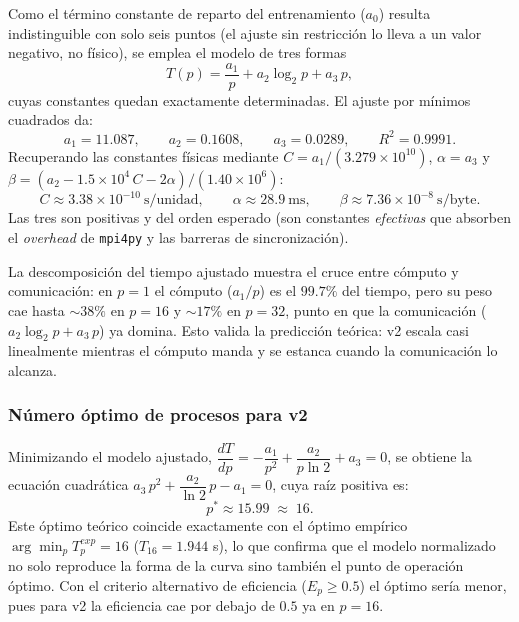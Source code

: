 Como el término constante de reparto del entrenamiento ($a_0$) resulta indistinguible con solo seis
puntos (el ajuste sin restricción lo lleva a un valor negativo, no físico), se emplea el modelo de
tres formas
\[
T(p) = \frac{a_1}{p} + a_2\log_2 p + a_3\,p,
\]
cuyas constantes quedan exactamente determinadas. El ajuste por mínimos cuadrados da:
\[
a_1 = 11.087,
\qquad
a_2 = 0.1608,
\qquad
a_3 = 0.0289,
\qquad
R^2 = 0.9991.
\]
Recuperando las constantes físicas mediante $C = a_1/(3.279\times10^{10})$, $\alpha = a_3$ y
$\beta = (a_2 - 1.5\times10^4\,C - 2\alpha)/(1.40\times10^6)$:
\[
C \approx 3.38\times10^{-10}\ \text{s/unidad},
\qquad
\alpha \approx 28.9\ \text{ms},
\qquad
\beta \approx 7.36\times10^{-8}\ \text{s/byte}.
\]
Las tres son positivas y del orden esperado (son constantes \emph{efectivas} que absorben el
\emph{overhead} de \texttt{mpi4py} y las barreras de sincronización).

La descomposición del tiempo ajustado muestra el cruce entre cómputo y comunicación: en $p=1$ el
cómputo ($a_1/p$) es el $99.7\%$ del tiempo, pero su peso cae hasta $\sim38\%$ en $p=16$ y
$\sim17\%$ en $p=32$, punto en que la comunicación ($a_2\log_2 p + a_3\,p$) ya domina. Esto valida
la predicción teórica: v2 escala casi linealmente mientras el cómputo manda y se estanca cuando la
comunicación lo alcanza.

\subsubsection{Número óptimo de procesos para v2}

Minimizando el modelo ajustado, $\dfrac{dT}{dp} = -\dfrac{a_1}{p^2} + \dfrac{a_2}{p\ln 2} + a_3 = 0$,
se obtiene la ecuación cuadrática $a_3\,p^2 + \dfrac{a_2}{\ln 2}\,p - a_1 = 0$, cuya raíz positiva es:
\[
p^* \approx 15.99 \;\approx\; 16.
\]
Este óptimo teórico coincide exactamente con el óptimo empírico $\arg\min_p T_p^{exp} = 16$
($T_{16} = 1.944$ s), lo que confirma que el modelo normalizado no solo reproduce la forma de la
curva sino también el punto de operación óptimo. Con el criterio alternativo de eficiencia
($E_p \geq 0.5$) el óptimo sería menor, pues para v2 la eficiencia cae por debajo de $0.5$ ya en
$p=16$.

